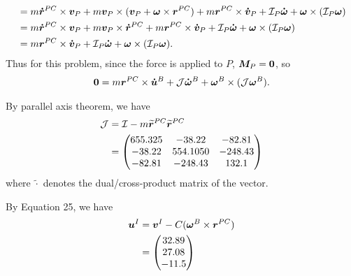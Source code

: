 \documentclass[12pt]{article}
\begin{document}
\begin{problem}[3]
\begin{align}
	&= m {\bm{ \dot{r}}}^{PC}  \times {\bm{ v}}_P + m{\bm{ v}}_P \times ( {\bm{ v}}_P+ {\bm{ \omega}} \times {\bm{ r}}^{PC} )  + m {\bm{ r}}^{PC} \times {\bm{ \dot{v}}}_P + \mathcal{ I}_P {\bm{ \dot{\omega}}} + {\bm{ \omega}} \times (\mathcal{ I}_P {\bm{ \omega}})     \\
	&= m {\bm{ \dot{r}}}^{PC}  \times {\bm{ v}}_P + m{\bm{ v}}_P \times {\bm{ \dot{r}}}^{PC} + m {\bm{ r}}^{PC} \times {\bm{ \dot{v}}}_P + \mathcal{ I}_P {\bm{ \dot{\omega}}} + {\bm{ \omega}} \times (\mathcal{ I}_P {\bm{ \omega}})     \\
	&= m {\bm{ r}}^{PC} \times {\bm{ \dot{v}}}_P + \mathcal{ I}_P {\bm{ \dot{\omega}}} + {\bm{ \omega}} \times (\mathcal{ I}_P {\bm{ \omega}})     .
\end{align}
Thus for this problem, since the force is applied to $ P$,  $ {\bm{ M}}_P = {\bm{ 0}}  $, so
\begin{align}
	{\bm{ 0}}  = m {\bm{ r}}^{PC} \times {\bm{ \dot{u}}}^{B} + \mathcal{ J} {\bm{ \dot{\omega}}}^{B} + {\bm{ \omega}}^{B} \times ( \mathcal{ J} {\bm{ \omega}}^{B} ).   
\end{align}
\end{problem}

\begin{problem}[4]
By parallel axis theorem, we have
\begin{align*}
	\mathcal{ J} &= \mathcal{ I} - m{\bm{ \widetilde{ r}}}^{PC} {\bm{ \widetilde{ r}}}^{PC} \\
		     &= \begin{pmatrix} 655.325&-38.22&-82.81\\-38.22&554.1050&-248.43\\-82.81&-248.43&132.1 \end{pmatrix}  
\end{align*}
where $ \widetilde{ \cdot  }$ denotes the dual/cross-product matrix of the vector.

By Equation 25, we have
\begin{align*}
	{\bm{ u}}^{I} &= {\bm{ v}}^{I} - C({\bm{ \omega}}^{B} \times {\bm{ r}}^{PC} ) \\
	&= \begin{pmatrix} 32.89\\27.08\\-11.5 \end{pmatrix} 
\end{align*}
\end{problem}
\end{document}
